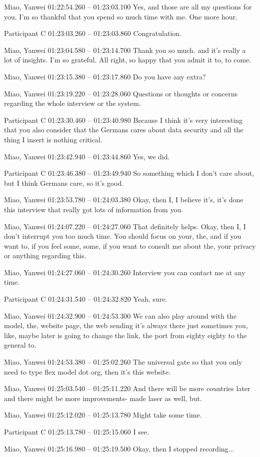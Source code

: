 {Miao, Yanwei 01:22:54.260 -- 01:23:03.100
Yes, and those are all my questions for you. I'm so thankful that you spend so much time with me. One more hour.

Participant C 01:23:03.260 -- 01:23:03.860
Congratulation.

Miao, Yanwei 01:23:04.580 -- 01:23:14.700
Thank you so much. and it's really a lot of insights. I'm so grateful. All right, so happy that you admit it to, to come.

Miao, Yanwei 01:23:15.380 -- 01:23:17.860
Do you have any extra?

Miao, Yanwei 01:23:19.220 -- 01:23:28.060
Questions or thoughts or concerns regarding the whole interview or the system.

Participant C 01:23:30.460 -- 01:23:40.980
Because I think it's very interesting that you also consider that the Germans cares about data security and all the thing I insert is nothing critical.

Miao, Yanwei 01:23:42.940 -- 01:23:44.860
Yes, we did.

Participant C 01:23:46.380 -- 01:23:49.940
So something which I don't care about, but I think Germans care, so it's good.

Miao, Yanwei 01:23:53.780 -- 01:24:03.380
Okay, then I, I believe it's, it's done this interview that really got lots of information from you.

Miao, Yanwei 01:24:07.220 -- 01:24:27.060
That definitely helps. Okay, then I, I don't interrupt you too much time. You should focus on your, the, and if you want to, if you feel some, some, if you want to consult me about the, your privacy or anything regarding this.

Miao, Yanwei 01:24:27.060 -- 01:24:30.260
Interview you can contact me at any time.

Participant C 01:24:31.540 -- 01:24:32.820
Yeah, sure.

Miao, Yanwei 01:24:32.900 -- 01:24:53.300
We can also play around with the model, the, website page, the web sending it's always there just sometimes you, like, maybe later is going to change the link, the port from eighty eighty to the general to.

Miao, Yanwei 01:24:53.380 -- 01:25:02.260
The universal gate so that you only need to type flex model dot org, then it's this website.

Miao, Yanwei 01:25:03.540 -- 01:25:11.220
And there will be more countries later and there might be more improvements- made laser as well, but.

Miao, Yanwei 01:25:12.020 -- 01:25:13.780
Might take some time.

Participant C 01:25:13.780 -- 01:25:15.060
I see.

Miao, Yanwei 01:25:16.980 -- 01:25:19.500
Okay, then I stopped recording...
}


